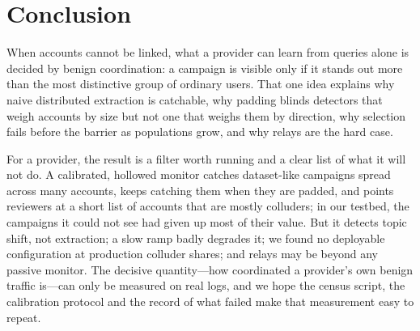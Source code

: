 \section{Conclusion}
\label{sec:conclusion}

When accounts cannot be linked, what a provider can learn from queries alone is decided by benign coordination: a campaign is visible only if it stands out more than the most distinctive group of ordinary users. That one idea explains why naive distributed extraction is catchable, why padding blinds detectors that weigh accounts by size but not one that weighs them by direction, why selection fails before the barrier as populations grow, and why relays are the hard case.

For a provider, the result is a filter worth running and a clear list of what it will not do. A calibrated, hollowed monitor catches dataset-like campaigns spread across many accounts, keeps catching them when they are padded, and points reviewers at a short list of accounts that are mostly colluders; in our testbed, the campaigns it could not see had given up most of their value. But it detects topic shift, not extraction; a slow ramp badly degrades it; we found no deployable configuration at production colluder shares; and relays may be beyond any passive monitor. The decisive quantity---how coordinated a provider's own benign traffic is---can only be measured on real logs, and we hope the census script, the calibration protocol and the record of what failed make that measurement easy to repeat.
